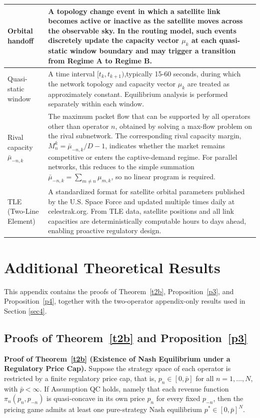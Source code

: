 \documentclass[review,3p,authoryear]{elsarticle}
\begin{document}
\begin{table}[!htpb]
{\begin{tabular}{@{}lp{14cm}@{}}
Orbital handoff & A topology change event in which a satellite link becomes active or inactive as the satellite moves across the observable sky. In the routing model, such events discretely update the capacity vector $\mu_k$ at each quasi-static window boundary and may trigger a transition from Regime A to Regime B. \\ \hline
Quasi-static window & A time interval $[t_k, t_{k+1})$,typically 15-60 seconds, during which the network topology and capacity vector $\mu_k$ are treated as approximately constant. Equilibrium analysis is performed separately within each window. \\ \hline
Rival capacity $\bar{\mu}_{-n, k}$ & The maximum packet flow that can be supported by all operators other than operator $n$, obtained by solving a max-flow problem on the rival subnetwork. The corresponding rival capacity margin, $M_n^k = \bar{\mu}_{-n, k}/D -1$, indicates whether the market remains competitive or enters the captive-demand regime. For parallel networks, this reduces to the simple summation $\bar{\mu}_{-n, k} = \sum_{m \neq n} \mu_{m, k}$, so no linear program is required. \\ \hline
TLE (Two-Line Element) & A standardized format for satellite orbital parameters published by the U.S. Space Force and updated multiple times daily at celestrak.org. From TLE data, satellite positions and all link capacities are deterministically computable hours to days ahead, enabling proactive regulatory design. \\ \bottomrule
\end{tabular}%
}
\end{table}
\section{Additional Theoretical Results}

This appendix contains the proofs of Theorem~\ref{t2b}, Proposition~\ref{p3}, and Proposition~\ref{p4}, together with the two-operator appendix-only results used in Section \ref{sec4}.

\subsection{Proofs of Theorem~\ref{t2b} and Proposition~\ref{p3}}

\medskip\noindent\textbf{Proof of Theorem~\ref{t2b} (Existence of Nash Equilibrium under a Regulatory Price Cap).}
Suppose the strategy space of each operator is restricted by a finite regulatory price cap, that is, $p_{n}{\in}[0,\bar{p}]$ for all $n=1,{\dots},N$, with $\bar{p}<{\infty}$. If Assumption QC holds, namely that each revenue function ${\pi}_{n}(p_{n},p_{-n})$ is quasi-concave in its own price $p_{n}$ for every fixed $p_{-n}$, then the pricing game admits at least one pure-strategy Nash equilibrium $p^{*}{\in}[0,\bar{p}]^{N}$.
\end{document}
